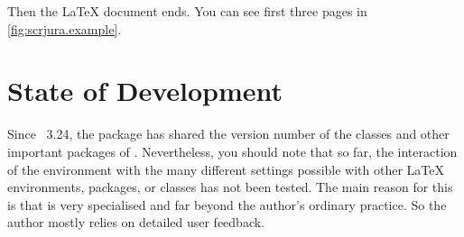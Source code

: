 %
Then the \LaTeX{} document ends. You can see first three pages in
\autoref{fig:scrjura.example}.%
%
\begin{figure}
  \setcapindent{0pt}%
  \label{fig:scrjura.example}
\end{figure}

\section{State of Development}
\label{sec:scrjura.draft}

Since \KOMAScript~3.24, the  package has shared the version
number of the classes and other important packages of \KOMAScript.
Nevertheless, you should note that so far, the interaction of the
 environment with the many different settings
possible with other \LaTeX{} environments, packages, or classes has not been
tested. The main reason for this is that  is very specialised
and far beyond the author's ordinary practice. So the author mostly relies on
detailed user feedback.%
\EndIndexGroup

\endinput

